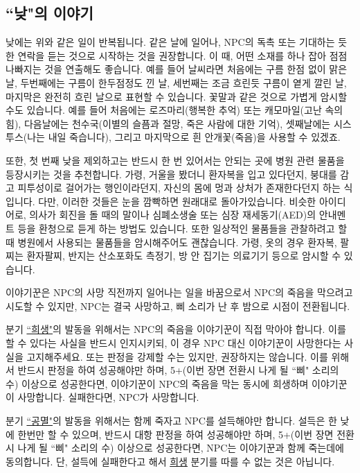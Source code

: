 \documentclass{report}
\begin{document}
		\subsection{``낮"의 이야기}
		
		낮에는 위와 같은 일이 반복됩니다. 같은 날에 일어나, NPC의 독촉 또는 기대하는 듯한 연락을 듣는 것으로 시작하는 것을 권장합니다. 이 때, 어떤 소재를 하나 잡아 점점 나빠지는 것을 연출해도 좋습니다. 예를 들어 날씨라면 처음에는 구름 한점 없이 맑은 날, 두번째에는 구름이 한두점정도 낀 날, 세번째는 조금 흐린듯 구름이 옅게 깔린 날, 마지막은 완전히 흐린 날으로 표현할 수 있습니다. 꽃말과 같은 것으로 가볍게 암시할 수도 있습니다. 예를 들어 처음에는 로즈마리(행복한 추억) 또는 캐모마일(고난 속의 힘), 다음날에는 천수국(이별의 슬픔과 절망, 죽은 사람에 대한 기억), 셋째날에는 시스투스(나는 내일 죽습니다), 그리고 마지막으로 흰 안개꽃(죽음)을 사용할 수 있겠죠.
		
		또한, 첫 번째 낮을 제외하고는 반드시 한 번 있어서는 안되는 곳에 병원 관련 물품을 등장시키는 것을 추천합니다. 가령, 거울을 봤더니 환자복을 입고 있다던지, 붕대를 감고 피투성이로 걸어가는 행인이라던지, 자신의 몸에 멍과 상처가 존재한다던지 하는 식입니다. 다만, 이러한 것들은 눈을 깜빡하면 원래대로 돌아가있습니다. 비슷한 아이디어로, 의사가 회진을 돌 때의 말이나 심폐소생술 또는 심장 재세동기(AED)의 안내멘트 등을 환청으로 듣게 하는 방법도 있습니다. 또한 일상적인 물품들을 관찰하려고 할 때 병원에서 사용되는 물품들을 암시해주어도 괜찮습니다. 가령, 옷의 경우 환자복, 팔찌는 환자팔찌, 반지는 산소포화도 측정기, 방 안 집기는 의료기기 등으로 암시할 수 있습니다.
		
		이야기꾼은 NPC의 사망 직전까지 일어나는 일을 바꿈으로서 NPC의 죽음을 막으려고 시도할 수 있지만, NPC는 결국 사망하고, 삐 소리가 난 후 밤으로 시점이 전환됩니다.
		
		분기 \hyperlink{dream-sacrifice}{``희생"}의 발동을 위해서는 NPC의 죽음을 이야기꾼이 직접 막아야 합니다. 이를 할 수 있다는 사실을 반드시 인지시키되, 이 경우 NPC 대신 이야기꾼이 사망한다는 사실을 고지해주세요. 또는 판정을 강제할 수는 있지만, 권장하지는 않습니다. 이를 위해서 반드시 판정을 하여 성공해야만 하며, 5+(이번 장면 전환시 나게 될 ``삐" 소리의 수) 이상으로 성공한다면, 이야기꾼이 NPC의 죽음을 막는 동시에 희생하며 이야기꾼이 사망합니다. 실패한다면, NPC가 사망합니다.
		
		분기 \hyperlink{dream-corrupt}{``공멸"}의 발동을 위해서는 함께 죽자고 NPC를 설득해야만 합니다. 설득은 한 낮에 한번만 할 수 있으며, 반드시 대항 판정을 하여 성공해야만 하며, 5+(이번 장면 전환시 나게 될 ``삐" 소리의 수) 이상으로 성공한다면, NPC는 이야기꾼과 함께 죽는데에 동의합니다. 단, 설득에 실패한다고 해서 \hyperlink{dream-sacrifice}{희생} 분기를 따를 수 없는 것은 아닙니다.
		
\end{document}
